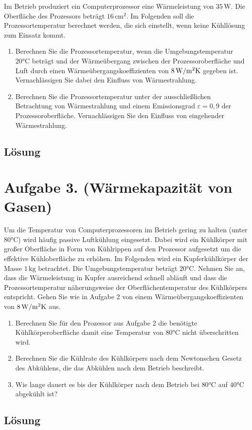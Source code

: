 \documentclass[german,12pt]{homework}
\begin{document}
    \begin{problem}
        Im Betrieb produziert ein Computerprozessor eine Wärmeleistung von \(35\,\si{\watt}\). Die Oberfläche des Prozessors beträgt \(16\,\si{\centi\meter\squared}\). Im Folgenden soll die Prozessortemperatur berechnet werden, die sich einstellt, wenn keine Kühllösung zum Einsatz kommt.
        \begin{enumerate}
            \item Berechnen Sie die Prozessortemperatur, wenn die Umgebungstemperatur \(20\si{\degreeCelsius}\) beträgt und der Wärmeübergang zwischen der Prozessoroberfläche und Luft durch einen Wärmeübergangskoeffizienten von \(8\,\si{\watt\per{\meter\squared\kelvin}}\) gegeben ist. Vernachlässigen Sie dabei den Einfluss von Wärmestrahlung.
            \item Berechnen Sie die Prozessortemperatur unter der ausschließlichen Betrachtung von Wärmestrahlung und einem Emissionsgrad \(\varepsilon = 0,9\) der Prozessoroberfläche. Vernachlässigen Sie den Einfluss von eingehender Wärmestrahlung.
        \end{enumerate}
    \end{problem}

    \subsection*{Lösung}

    \section*{Aufgabe 3. (Wärmekapazität von Gasen)}

    \begin{problem}
        Um die Temperatur von Computerprozessoren im Betrieb gering zu halten (unter \(80\si{\degreeCelsius}\)) wird häufig passive Luftkühlung eingesetzt. Dabei wird ein Kühlkörper mit großer Oberfläche in Form von Kühlrippen auf den Prozessor aufgesetzt um die effektive Kühloberfläche zu erhöhen. Im Folgenden wird ein Kupferkühlkörper der Masse \(1\,\si{\kilogram}\) betrachtet. Die Umgebungstemperatur beträgt \(20\si{\degreeCelsius}\). Nehmen Sie an, dass die Wärmeleistung in Kupfer ausreichend schnell abläuft und dass die Prozessortemperatur näherungsweise der Oberflächentemperatur des Kühlkörpers entspricht. Gehen Sie wie in Aufgabe 2 von einem Wärmeübergangskoeffizienten von \(8\,\si{\watt\per{\meter\squared\kelvin}}\) aus.
        \begin{enumerate}
            \item Berechnen Sie für den Prozessor aus Aufgabe 2 die benötigte Kühlkörperoberfläche damit eine Temperatur von \(80\si{\degreeCelsius}\) nicht überschritten wird.
            \item Berechnen Sie die Kühlrate des Kühlkörpers nach dem Newtonschen Gesetz des Abkühlens, die das Abkühlen nach dem Betrieb beschreibt.
            \item Wie lange dauert es bis der Kühlkörper nach dem Betrieb bei \(80\si{\degreeCelsius}\) auf \(40\si{\degreeCelsius}\) abgekühlt ist?
        \end{enumerate}
    \end{problem}

    \subsection*{Lösung}
\end{document}
